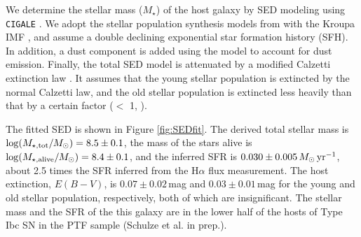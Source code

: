 \documentclass[twocolumn]{aastex63}
\begin{document}
We determine the stellar mass ($M_{\star}$) of the host galaxy by SED modeling using 
\texttt{CIGALE} \citep{CIGALE19}. We adopt the stellar population synthesis models from \citet{BC03} 
with the Kroupa IMF \citep{Kroupa01}, and assume a double declining  exponential star formation 
history (SFH). In addition, a dust component is added using the \citet{DL07} model to account for dust 
emission. Finally, the total SED model is attenuated by a modified Calzetti extinction law 
\citep{Calzetti2000}. It assumes that the young stellar population is extincted by the normal Calzetti 
law, and the old stellar population is extincted less heavily than that by a certain factor ($<$ 1, 
\citealt{Charlot2000}). 

The fitted SED is shown in Figure 
\ref{fig:SEDfit}. The derived total stellar mass is ${\rm log}(M_{\star, \rm tot}/M_{\odot}) = 8.5 \pm 0.1$, 
the mass of the stars alive is ${\rm log}(M_{\star, \rm alive}/M_{\odot}) = 8.4 \pm 0.1$, and the 
inferred SFR is $0.030 \pm 0.005\, M_\odot\, {\rm yr^{-1}}$, about 2.5 times the SFR inferred 
from the H$\alpha$ flux measurement. The host extinction, $E(B - V)$, is $0.07 \pm 
0.02$\,mag and $0.03 \pm 0.01$\,mag for the young and old stellar population, respectively, 
both of which are insignificant. The stellar mass and the SFR of the this galaxy are in the lower half of 
the hosts of Type Ibc SN in the PTF sample (Schulze et al. in prep.). 


{}

\end{document}
